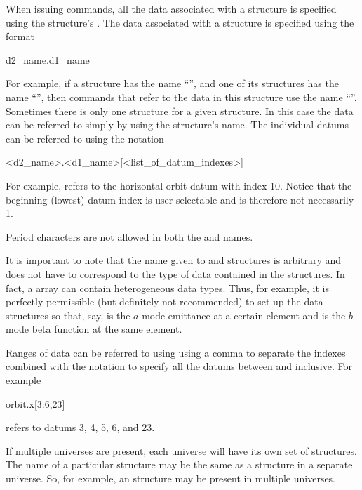 When issuing \tao commands, all the data associated with a  structure is specified using
the  structure's .  The data associated with a  structure is
specified using the format
\begin{example}
  d2_name.d1_name
\end{example}
For example, if a  structure has the name ``'', and one of its 
structures has the name ``'', then \tao commands that refer to the data in this 
structure use the name ``''. Sometimes there is only one  structure for a
given  structure. In this case the data can be referred to simply by using the
 structure's name. The individual datums can be referred to using the notation
\begin{example}
  <d2_name>.<d1_name>[<list_of_datum_indexes>]
\end{example}
For example,  refers to the horizontal orbit datum with index 10. Notice that the
beginning (lowest) datum index is user selectable and is therefore not necessarily 1.

Period characters are not allowed in both the  and  names.

It is important to note that the name given to  and  structures is arbitrary
and does not have to correspond to the type of data contained in the structures. In fact, a
 array can contain heterogeneous data types.  Thus, for example, it is perfectly
permissible (but definitely not recommended) to set up the data structures so that, say,
 is the $a$-mode emittance at a certain element and  is the $b$-mode
beta function at the same element.

Ranges of data can be referred to using using a comma \vn{,} to separate the indexes combined with
the notation  to specify all the datums between  and  inclusive. For example
\begin{example}
  orbit.x[3:6,23]
\end{example}
refers to datums 3, 4, 5, 6, and 23. 

If multiple universes are present, each universe will have its own set of 
structures. The name of a particular  structure may be the same as a 
structure in a separate universe. So, for example, an   structure may
be present in multiple universes.

